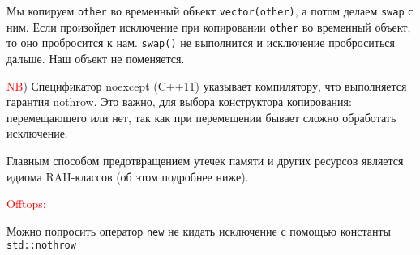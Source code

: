 Мы копируем \texttt{other} во временный объект \texttt{vector(other)}, а потом делаем \texttt{swap} с ним. Если произойдет исключение при копировании \texttt{other} во временный объект, то оно пробросится к нам. \texttt{swap()} не выполнится и исключение проброситься дальше. Наш объект не поменяется.

\textcolor{red}{NB}) Спецификатор noexcept (C++11) указывает компилятору, что выполняется гарантия nothrow. Это важно, для выбора конструктора копирования: перемещающего или нет, так как при перемещении бывает сложно обработать исключение.

Главным способом предотвращением утечек памяти и других ресурсов является идиома RAII-классов (об этом подробнее ниже).

\textcolor{red}{Offtops:}

Можно попросить оператор \texttt{new} не кидать исключение с помощью константы \texttt{std::nothrow}
